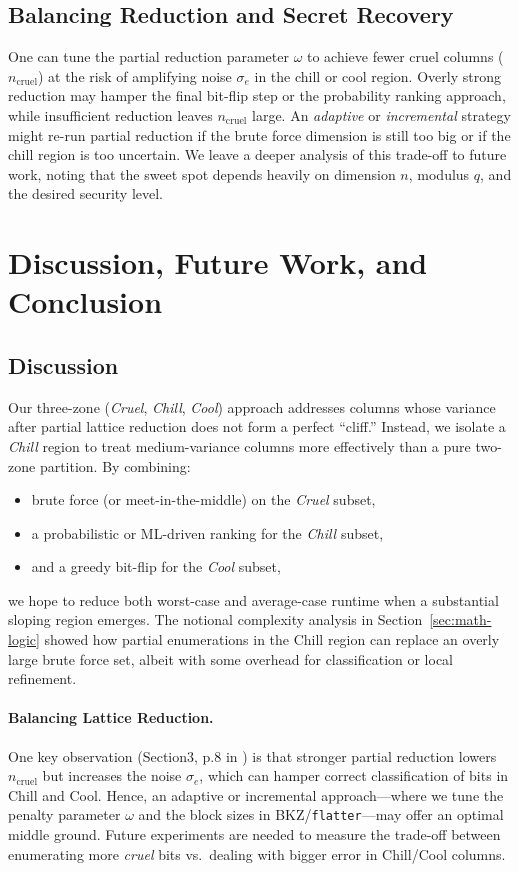 \documentclass[conference]{IEEEtran}
\begin{document}
\subsection{Balancing Reduction and Secret Recovery}
\label{subsec:balance}

One can tune the partial reduction parameter $\omega$ to achieve fewer cruel columns ($n_{\mathrm{cruel}}$) at the risk of amplifying noise $\sigma_e$ in the chill or cool region. Overly strong reduction may hamper the final bit-flip step or the probability ranking approach, while insufficient reduction leaves $n_{\mathrm{cruel}}$ large. An \emph{adaptive} or \emph{incremental} strategy might re-run partial reduction if the brute force dimension is still too big or if the chill region is too uncertain. We leave a deeper analysis of this trade-off to future work, noting that the sweet spot depends heavily on dimension $n$, modulus $q$, and the desired security level.

\section{Discussion, Future Work, and Conclusion}
\label{sec:discussion-future-conclusion}

\subsection{Discussion}
Our three-zone (\emph{Cruel}, \emph{Chill}, \emph{Cool}) approach addresses columns whose variance after partial lattice reduction does not form a perfect “cliff.” Instead, we isolate a \emph{Chill} region to treat medium-variance columns more effectively than a pure two-zone partition. By combining:
\begin{itemize}
    \item brute force (or meet-in-the-middle) on the \emph{Cruel} subset,
    \item a probabilistic or ML-driven ranking for the \emph{Chill} subset, 
    \item and a greedy bit-flip for the \emph{Cool} subset,
\end{itemize}
we hope to reduce both worst-case and average-case runtime when a substantial sloping region emerges. The notional complexity analysis in Section~\ref{sec:math-logic} showed how partial enumerations in the Chill region can replace an overly large brute force set, albeit with some overhead for classification or local refinement.

\paragraph{Balancing Lattice Reduction.}
One key observation (Section3, p.8 in \cite{cool-and-cruel}) is that stronger partial reduction lowers $n_{\mathrm{cruel}}$ but increases the noise $\sigma_e$, which can hamper correct classification of bits in Chill and Cool. Hence, an adaptive or incremental approach—where we tune the penalty parameter $\omega$ and the block sizes in BKZ/\texttt{flatter}—may offer an optimal middle ground. Future experiments are needed to measure the trade-off between enumerating more \emph{cruel} bits vs.\ dealing with bigger error in Chill/Cool columns.
\end{document}
